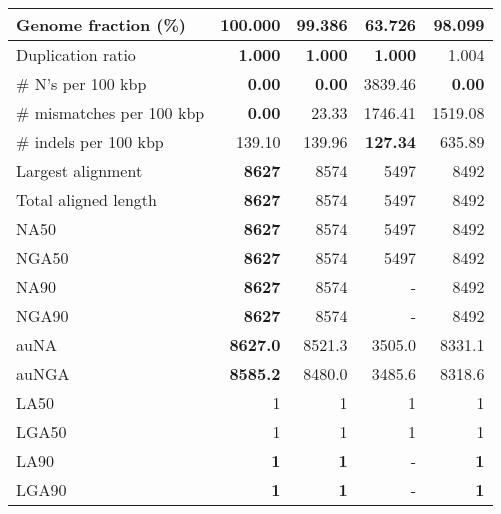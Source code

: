 \documentclass[12pt,a4paper]{article}
\begin{document}
\begin{table}[ht]
\begin{center}
\begin{tabular}{|l*{4}{|r}|}
Genome fraction (\%) & {\bf 100.000} & 99.386 & 63.726 & 98.099 \\ \hline
Duplication ratio & {\bf 1.000} & {\bf 1.000} & {\bf 1.000} & 1.004 \\ \hline
\# N's per 100 kbp & {\bf 0.00} & {\bf 0.00} & 3839.46 & {\bf 0.00} \\ \hline
\# mismatches per 100 kbp & {\bf 0.00} & 23.33 & 1746.41 & 1519.08 \\ \hline
\# indels per 100 kbp & 139.10 & 139.96 & {\bf 127.34} & 635.89 \\ \hline
Largest alignment & {\bf 8627} & 8574 & 5497 & 8492 \\ \hline
Total aligned length & {\bf 8627} & 8574 & 5497 & 8492 \\ \hline
NA50 & {\bf 8627} & 8574 & 5497 & 8492 \\ \hline
NGA50 & {\bf 8627} & 8574 & 5497 & 8492 \\ \hline
NA90 & {\bf 8627} & 8574 & - & 8492 \\ \hline
NGA90 & {\bf 8627} & 8574 & - & 8492 \\ \hline
auNA & {\bf 8627.0} & 8521.3 & 3505.0 & 8331.1 \\ \hline
auNGA & {\bf 8585.2} & 8480.0 & 3485.6 & 8318.6 \\ \hline
LA50 & 1 & 1 & 1 & 1 \\ \hline
LGA50 & 1 & 1 & 1 & 1 \\ \hline
LA90 & {\bf 1} & {\bf 1} & - & {\bf 1} \\ \hline
LGA90 & {\bf 1} & {\bf 1} & - & {\bf 1} \\ \hline
\end{tabular}
\end{center}
\end{table}
\end{document}
